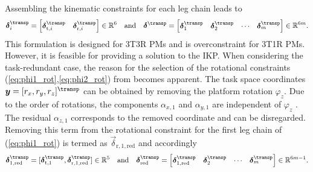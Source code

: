 \documentclass[
	graybox,
	vecphys] %
	{svmult}
\newcommand{\Res}[0]{\vec{\delta}}
\begin{document}
Assembling the kinematic constraints for each leg chain leads to 
%
\begin{equation}
\vspace{-0.1cm}
\Res_i^\transp=\begin{bmatrix}
\Res_{\mathrm{t},i}^\transp & \Res_{\mathrm{r},i}^\transp
\end{bmatrix} \in {\mathbb{R}}^{6}
\quad \mathrm{and} \quad
\Res^\transp
=
\begin{bmatrix}
\Res_1^\transp &
\Res_2^\transp &
\cdots &
\Res_m^\transp
\end{bmatrix} \in {\mathbb{R}}^{6m}.
\label{eq:constr}
\end{equation}
%
This formulation is designed for 3T3R PMs and is overconstraint for 3T1R PMs.
However, it is feasible for providing a solution to the IKP. %
%
When considering the task-redundant case, the reason for the selection of the rotational constraints (\ref{eq:phi1_rot},\ref{eq:phi2_rot}) from \cite{SchapplerTapOrt2019} becomes apparent.
The task space coordinates
$\vec{y}
=
[r_x,r_y,r_z]^\transp
$
can be obtained by removing the platform rotation $\varphi_z$. %
Due to the order of rotations, the components $\alpha_{x,1}$ and $\alpha_{y,1}$ are independent of $\varphi_z$ \cite{SchapplerTapOrt2019}.
The residual $\alpha_{z,1}$ corresponds to the removed coordinate and can be disregarded.
Removing this term from the rotational constraint for the first leg chain of (\ref{eq:phi1_rot}) is termed as $\Res_{\mathrm{r},1,\mathrm{red}}$ and accordingly
%
\vspace{-0.1cm}
\begin{equation}
\Res_{1,\mathrm{red}}^\transp=[\Res_{\mathrm{t},1}^\transp, \Res_{\mathrm{r},1,\mathrm{red}}^\transp] \in \mathbb{R}^5
\quad \mathrm{and} \quad
\Res_\mathrm{red}^\transp
=
\begin{bmatrix}
\Res_{1,\mathrm{red}}^\transp &
\Res_2^\transp &
\cdots &
\Res_m^\transp
\end{bmatrix} \in {\mathbb{R}}^{6m-1}.
\vspace{-0.1cm}
\label{equ:constr_red}
\end{equation}
\end{document}
